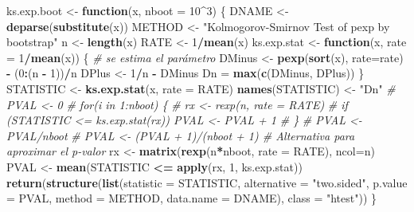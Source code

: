 \documentclass[
]{book}
\newenvironment{Shaded}{\begin{snugshade}}{\end{snugshade}}
\newcommand{\CommentTok}[1]{\textcolor[rgb]{0.56,0.35,0.01}{\textit{#1}}}
\newcommand{\ControlFlowTok}[1]{\textcolor[rgb]{0.13,0.29,0.53}{\textbf{#1}}}
\newcommand{\DataTypeTok}[1]{\textcolor[rgb]{0.13,0.29,0.53}{#1}}
\newcommand{\DecValTok}[1]{\textcolor[rgb]{0.00,0.00,0.81}{#1}}
\newcommand{\KeywordTok}[1]{\textcolor[rgb]{0.13,0.29,0.53}{\textbf{#1}}}
\newcommand{\NormalTok}[1]{#1}
\newcommand{\OperatorTok}[1]{\textcolor[rgb]{0.81,0.36,0.00}{\textbf{#1}}}
\newcommand{\StringTok}[1]{\textcolor[rgb]{0.31,0.60,0.02}{#1}}
\theoremstyle{break}
\theoremstyle{definition}
\theoremstyle{definition}
\theoremstyle{definition}
\theoremstyle{remark}
\begin{document}
\begin{Shaded}
\begin{Highlighting}[]
\NormalTok{ks.exp.boot <-}\StringTok{ }\ControlFlowTok{function}\NormalTok{(x, }\DataTypeTok{nboot =} \DecValTok{10}\OperatorTok{^}\DecValTok{3}\NormalTok{) \{}
\NormalTok{  DNAME <-}\StringTok{ }\KeywordTok{deparse}\NormalTok{(}\KeywordTok{substitute}\NormalTok{(x))}
\NormalTok{  METHOD <-}\StringTok{ "Kolmogorov-Smirnov Test of pexp by bootstrap"} 
\NormalTok{  n <-}\StringTok{ }\KeywordTok{length}\NormalTok{(x)}
\NormalTok{  RATE <-}\StringTok{ }\DecValTok{1}\OperatorTok{/}\KeywordTok{mean}\NormalTok{(x)}
\NormalTok{  ks.exp.stat <-}\StringTok{ }\ControlFlowTok{function}\NormalTok{(x, }\DataTypeTok{rate =} \DecValTok{1}\OperatorTok{/}\KeywordTok{mean}\NormalTok{(x)) \{ }\CommentTok{# se estima el parámetro}
\NormalTok{    DMinus <-}\StringTok{ }\KeywordTok{pexp}\NormalTok{(}\KeywordTok{sort}\NormalTok{(x), }\DataTypeTok{rate=}\NormalTok{rate) }\OperatorTok{-}\StringTok{ }\NormalTok{(}\DecValTok{0}\OperatorTok{:}\NormalTok{(n }\OperatorTok{-}\StringTok{ }\DecValTok{1}\NormalTok{))}\OperatorTok{/}\NormalTok{n}
\NormalTok{    DPlus <-}\StringTok{ }\DecValTok{1}\OperatorTok{/}\NormalTok{n }\OperatorTok{-}\StringTok{ }\NormalTok{DMinus}
\NormalTok{    Dn =}\StringTok{ }\KeywordTok{max}\NormalTok{(}\KeywordTok{c}\NormalTok{(DMinus, DPlus))}
\NormalTok{  \}  }
\NormalTok{  STATISTIC <-}\StringTok{ }\KeywordTok{ks.exp.stat}\NormalTok{(x, }\DataTypeTok{rate =}\NormalTok{ RATE) }
  \KeywordTok{names}\NormalTok{(STATISTIC) <-}\StringTok{ "Dn"}
  \CommentTok{# PVAL <- 0}
  \CommentTok{# for(i in 1:nboot) \{}
  \CommentTok{#   rx <- rexp(n, rate = RATE)}
  \CommentTok{#   if (STATISTIC <= ks.exp.stat(rx)) PVAL <- PVAL + 1}
  \CommentTok{# \}}
  \CommentTok{# PVAL <- PVAL/nboot}
  \CommentTok{# PVAL <- (PVAL + 1)/(nboot + 1) # Alternativa para aproximar el p-valor}
\NormalTok{  rx <-}\StringTok{ }\KeywordTok{matrix}\NormalTok{(}\KeywordTok{rexp}\NormalTok{(n}\OperatorTok{*}\NormalTok{nboot, }\DataTypeTok{rate =}\NormalTok{ RATE), }\DataTypeTok{ncol=}\NormalTok{n)}
\NormalTok{  PVAL <-}\StringTok{ }\KeywordTok{mean}\NormalTok{(STATISTIC }\OperatorTok{<=}\StringTok{ }\KeywordTok{apply}\NormalTok{(rx, }\DecValTok{1}\NormalTok{, ks.exp.stat))}
  \KeywordTok{return}\NormalTok{(}\KeywordTok{structure}\NormalTok{(}\KeywordTok{list}\NormalTok{(}\DataTypeTok{statistic =}\NormalTok{ STATISTIC, }\DataTypeTok{alternative =} \StringTok{"two.sided"}\NormalTok{, }
                   \DataTypeTok{p.value =}\NormalTok{ PVAL, }\DataTypeTok{method =}\NormalTok{ METHOD, }\DataTypeTok{data.name =}\NormalTok{ DNAME), }
                   \DataTypeTok{class =} \StringTok{"htest"}\NormalTok{))}
\NormalTok{\}}
\end{Highlighting}
\end{Shaded}
\end{document}
